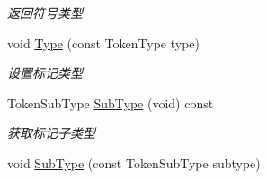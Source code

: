 \begin{DoxyCompactItemize}
\begin{DoxyCompactList}\small\item\em 返回符号类型 \end{DoxyCompactList}\item 
\hypertarget{class_lexer_sys_1_1_token_a9248a2dacaa37bc8f40e36074c89a1f9}{void \hyperlink{class_lexer_sys_1_1_token_a9248a2dacaa37bc8f40e36074c89a1f9}{Type} (const Token\-Type type)}\label{class_lexer_sys_1_1_token_a9248a2dacaa37bc8f40e36074c89a1f9}

\begin{DoxyCompactList}\small\item\em 设置标记类型 \end{DoxyCompactList}\item 
\hypertarget{class_lexer_sys_1_1_token_a164d618718b0c60462fab5bb1a5c7aec}{Token\-Sub\-Type \hyperlink{class_lexer_sys_1_1_token_a164d618718b0c60462fab5bb1a5c7aec}{Sub\-Type} (void) const }\label{class_lexer_sys_1_1_token_a164d618718b0c60462fab5bb1a5c7aec}

\begin{DoxyCompactList}\small\item\em 获取标记子类型 \end{DoxyCompactList}\item 
\hypertarget{class_lexer_sys_1_1_token_a195ebf5be49fa07821f4a377fee400d8}{void \hyperlink{class_lexer_sys_1_1_token_a195ebf5be49fa07821f4a377fee400d8}{Sub\-Type} (const Token\-Sub\-Type subtype)}\label{class_lexer_sys_1_1_token_a195ebf5be49fa07821f4a377fee400d8}


\end{DoxyCompactItemize}
